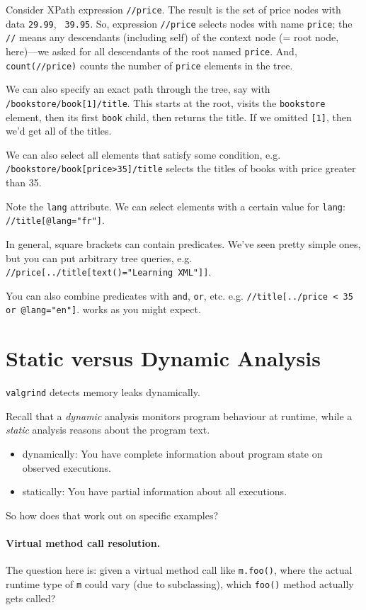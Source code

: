 \documentclass[11pt]{article}
\begin{document}
Consider XPath expression {\tt //price}. The
result is the set of price nodes with data {\tt 29.99}, {\tt
  39.95}. So, expression {\tt //price} selects nodes with name {\tt price};
the {\tt //} means any descendants (including self) of the context node (= root node, here)---we asked for all descendants of the root named {\tt price}.
And, {\tt count(//price)} counts the number of {\tt price} elements
in the tree.

We can also specify an exact path through the tree, say
with {\tt /bookstore/book[1]/title}. This starts at the root,
visits the {\tt bookstore} element, then its first {\tt book} child,
then returns the title. If we omitted {\tt [1]}, then we'd
get all of the titles.

We can also select all elements that satisfy some condition,
e.g. {\tt /bookstore/book[price>35]/title} selects the titles
of books with price greater than 35.

Note the {\tt lang} attribute. We can select elements with a
certain value for {\tt lang}: {\tt //title[@lang="fr"]}.

In general, square brackets can contain predicates. We've 
seen pretty simple ones, but you can put arbitrary tree queries,
e.g. {\tt //price[../title[text()="Learning XML"]]}.

You can also combine predicates with {\tt and}, {\tt or}, etc.
e.g. {\tt //title[../price < 35 or @lang="en"]}. 
{\tt *} works as you might expect.

\section*{Static versus Dynamic Analysis}
{\tt valgrind} detects memory leaks dynamically.

Recall that a \emph{dynamic} analysis monitors program behaviour at runtime,
while a \emph{static} analysis reasons about the program text.

\begin{itemize}[noitemsep]
\item dynamically: You have complete information about program state on observed executions.
\item statically: You have partial information about all executions.
\end{itemize}

So how does that work out on specific examples?

\paragraph{Virtual method call resolution.} The question here is:
given a virtual method call like {\tt m.foo()}, where the actual runtime type of {\tt m} 
could vary (due to subclassing), which {\tt foo()} method actually gets called?
\end{document}
